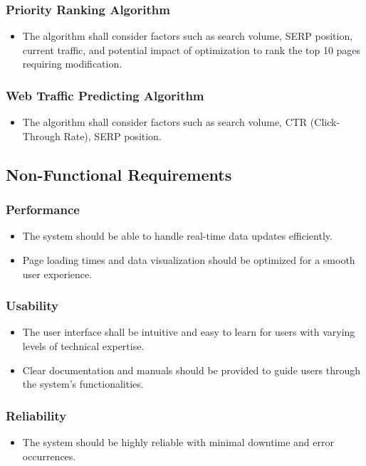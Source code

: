\documentclass[12pt]{article}
\begin{document}
\subsubsection{Priority Ranking Algorithm}
\begin{itemize}
    \item The algorithm shall consider factors such as search volume, SERP position, current traffic, and potential impact of optimization to rank the top 10 pages requiring modification.
\end{itemize}

\subsubsection{Web Traffic Predicting Algorithm}
\begin{itemize}
    \item The algorithm shall consider factors such as search volume, CTR (Click-Through Rate), SERP position.
\end{itemize}
\newpage 
\subsection{Non-Functional Requirements}

\subsubsection{Performance}
\begin{itemize}
    \item The system should be able to handle real-time data updates efficiently.
    \item Page loading times and data visualization should be optimized for a smooth user experience.
\end{itemize}

\subsubsection{Usability}
\begin{itemize}
    \item The user interface shall be intuitive and easy to learn for users with varying levels of technical expertise.
    \item Clear documentation and manuals should be provided to guide users through the system's functionalities.
\end{itemize}

\subsubsection{Reliability}
\begin{itemize}
    \item The system should be highly reliable with minimal downtime and error occurrences.
\end{itemize}
\newpage 
\end{document}
